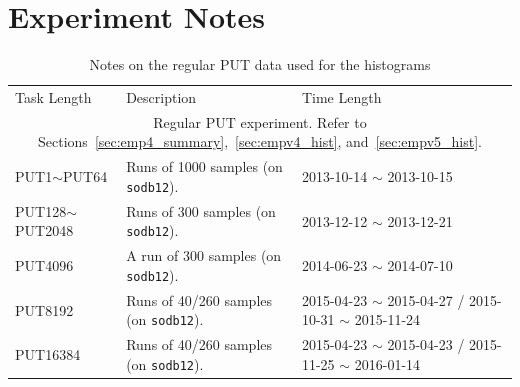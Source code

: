 \documentclass[10pt]{article}
\begin{document}
\section{Experiment Notes}
\begin{table}[h]
\begin{center}
\begin{tabular}{|p{3cm}||p{9cm}|p{4cm}|} \hline
Task Length & Description & Time Length\\ \cline{1-3}
\multicolumn{3}{|c|}{Regular PUT experiment. Refer to Sections~\ref{sec:emp4_summary},~\ref{sec:empv4_hist}, and~\ref{sec:empv5_hist}.} \\ \hline
PUT1$\sim$PUT64 & Runs of 1000 samples (on {\tt sodb12}). & 2013-10-14 $\sim$ 2013-10-15\\ \hline
PUT128$\sim$PUT2048 & Runs of 300 samples (on {\tt sodb12}). & 2013-12-12 $\sim$ 2013-12-21\\ \hline 
PUT4096 & A run of 300 samples (on {\tt sodb12}). & 2014-06-23 $\sim$ 2014-07-10 \\ \hline \hline
PUT8192 & Runs of 40/260 samples (on {\tt sodb12}). & 2015-04-23 $\sim$ 2015-04-27 / 2015-10-31 $\sim$ 2015-11-24\\ \hline
PUT16384 & Runs of 40/260 samples (on {\tt sodb12}). & 2015-04-23 $\sim$ 2015-04-23 / 2015-11-25 $\sim$ 2016-01-14\\ \hline 
\end{tabular}
\end{center}
\vspace{-.2in}
\caption{Notes on the regular PUT data used for the histograms\label{tab:exp_notes1}}
\end{table}
\end{document}
